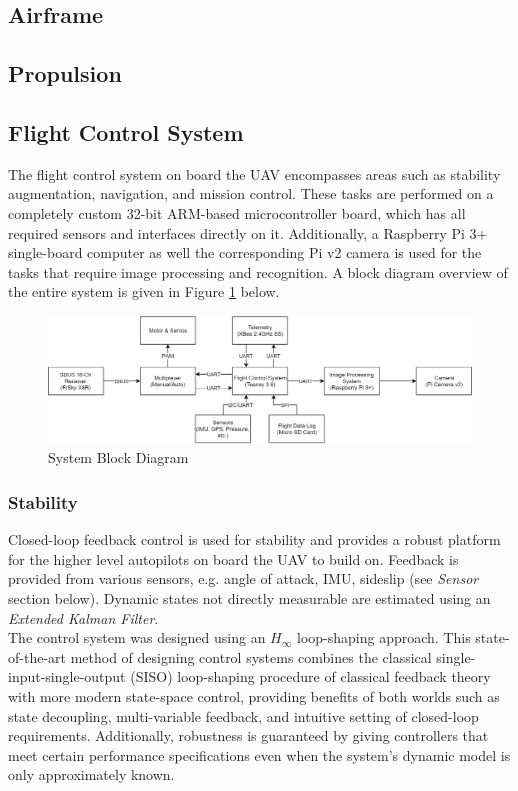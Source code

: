\subsection{Airframe}

\subsection{Propulsion}

\subsection{Flight Control System}
The flight control system on board the UAV encompasses areas such as stability augmentation, navigation, and mission control. These tasks are performed on a completely custom 32-bit ARM-based microcontroller board, which has all required sensors and interfaces directly on it. Additionally, a Raspberry Pi 3+ single-board computer as well the corresponding Pi v2 camera is used for the tasks that require image processing and recognition. A block diagram overview of the entire system is given in Figure \ref{fig:SysBlockDiag} below.

\begin{figure}[H]
\centering
\includegraphics[scale=0.3]{figs/SysBlockDiagram.png}
\caption{System Block Diagram}
\label{fig:SysBlockDiag}
\end{figure}

\subsubsection{Stability}
Closed-loop feedback control is used for stability and provides a robust platform for the higher level autopilots on board the UAV to build on. Feedback is provided from various sensors, e.g. angle of attack, IMU, sideslip (see \textit{Sensor} section below). Dynamic states not directly measurable are estimated using an \textit{Extended Kalman Filter}. \\

The control system was designed using an $H_{\infty}$ loop-shaping approach. This state-of-the-art method of designing control systems combines the classical single-input-single-output (SISO) loop-shaping procedure of classical feedback theory with more modern state-space control, providing benefits of both worlds such as state decoupling, multi-variable feedback, and intuitive setting of closed-loop requirements. Additionally, robustness is guaranteed by giving controllers that meet certain performance specifications even when the system's dynamic model is only approximately known. \\

